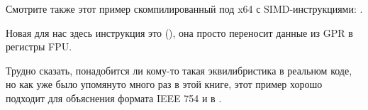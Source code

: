 

Смотрите также этот пример скомпилированный под x64 с SIMD-инструкциями: .


Новая для нас здесь инструкция это  (), она просто переносит данные из \ac{GPR} в регистры FPU.



\subsectionold{\Conclusion}

Трудно сказать, понадобится ли кому-то такая эквилибристика в реальном коде,
но как уже было упомянуто много раз в этой книге, этот пример хорошо подходит для объяснения формата
IEEE 754 и  в \CCpp.

